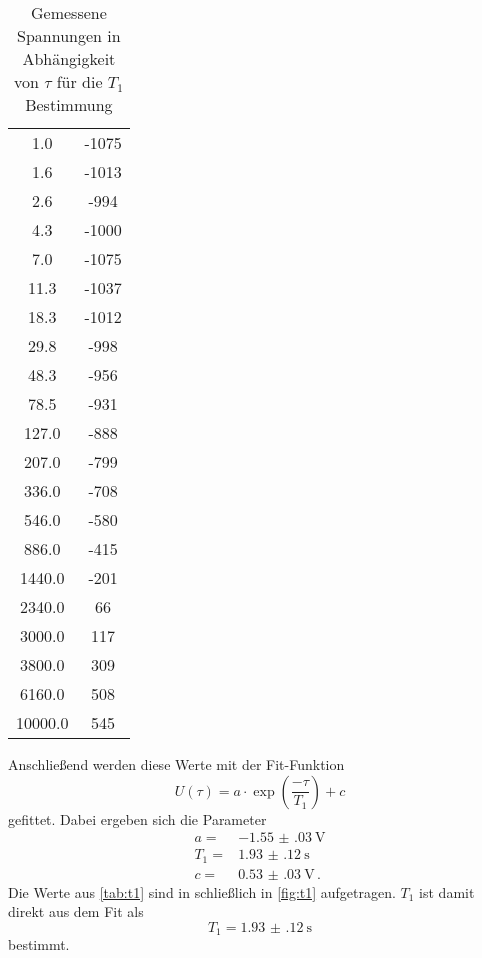 \begin{table}
    \centering
    \caption{Gemessene Spannungen in Abhängigkeit von $\tau$ für die $T_1$ Bestimmung}
    \label{tab:t1}
    \begin{tabular}{S[table-format=5.1] S[table-format=4.0]}
        \toprule
        \tableSI{\tau}{\milli\second} &   \\
         &  -1075  \\
        1.6 & -1013 \\
        2.6 & -994 \\
        4.3 & -1000 \\
        7.0 & -1075 \\
        11.3 & -1037 \\
        18.3 & -1012 \\
        29.8 & -998 \\
        48.3 & -956 \\
        78.5 & -931 \\
        127.0 & -888 \\
        207.0 & -799 \\
        336.0 & -708 \\
        546.0 & -580 \\
        886.0 & -415 \\
        1440.0 & -201 \\
        2340.0 & 66 \\
        3000.0 & 117 \\
        3800.0 & 309 \\
        6160.0 & 508 \\
        10000.0 & 545 \\
        \bottomrule
    \end{tabular}
\end{table}

Anschließend werden diese Werte mit der Fit-Funktion 
\begin{equation}
    U(\tau) = a \cdot \exp(\frac{- \tau}{T_1}) + c 
    \label{eq:fit_t1}
\end{equation}
gefittet.
Dabei ergeben sich die Parameter 
\begin{align*}
    a =& \SI{-1.55(03)}{\volt} \\
    T_1 =& \SI{1.93(12)}{\second} \\
    c =& \SI{0.53(03)}{\volt} \, .
\end{align*}
Die Werte aus \autoref{tab:t1} sind in schließlich in \autoref{fig:t1} aufgetragen.
$T_1$ ist damit direkt aus dem Fit als 
\begin{equation}
    T_1 = \SI{1.93(12)}{\second} 
    \label{eq:t1_wert}
\end{equation}
bestimmt.

